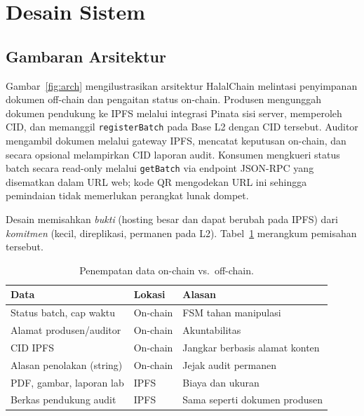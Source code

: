 \section{Desain Sistem}
\label{sec:design}

\subsection{Gambaran Arsitektur}
Gambar~\ref{fig:arch} mengilustrasikan arsitektur HalalChain melintasi penyimpanan dokumen off-chain dan pengaitan status on-chain.
Produsen mengunggah dokumen pendukung ke IPFS melalui integrasi Pinata sisi server, memperoleh CID, dan memanggil \texttt{registerBatch} pada Base L2 dengan CID tersebut.
Auditor mengambil dokumen melalui gateway IPFS, mencatat keputusan on-chain, dan secara opsional melampirkan CID laporan audit.
Konsumen mengkueri status batch secara read-only melalui \texttt{getBatch} via endpoint JSON-RPC yang disematkan dalam URL web; kode QR mengodekan URL ini sehingga pemindaian tidak memerlukan perangkat lunak dompet.



Desain memisahkan \emph{bukti} (hosting besar dan dapat berubah pada IPFS) dari \emph{komitmen} (kecil, direplikasi, permanen pada L2).
Tabel~\ref{tab:datasplit} merangkum pemisahan tersebut.

\begin{table}[t]
  \caption{Penempatan data on-chain vs.\ off-chain.}
  \label{tab:datasplit}
  \centering
  \footnotesize
  \begin{tabularx}{\columnwidth}{@{}>{\raggedright\arraybackslash}p{}>{\raggedright\arraybackslash}p{}X@{}}
    \toprule
    \textbf{Data} & \textbf{Lokasi} & \textbf{Alasan} \\
    \midrule
    Status batch, cap waktu & On-chain & FSM tahan manipulasi \\
    Alamat produsen/auditor & On-chain & Akuntabilitas \\
    CID IPFS & On-chain & Jangkar berbasis alamat konten \\
    Alasan penolakan (string) & On-chain & Jejak audit permanen \\
    PDF, gambar, laporan lab & IPFS & Biaya dan ukuran \\
    Berkas pendukung audit & IPFS & Sama seperti dokumen produsen \\
    \bottomrule
  \end{tabularx}
\end{table}

